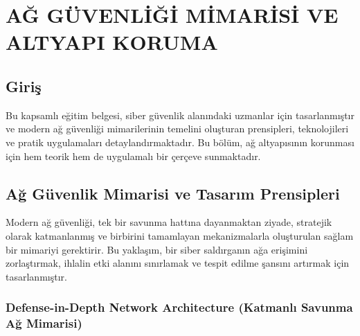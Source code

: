 \chapter{AĞ GÜVENLİĞİ MİMARİSİ VE ALTYAPI KORUMA}

\section*{Giriş}
Bu kapsamlı eğitim belgesi, siber güvenlik alanındaki uzmanlar için tasarlanmıştır ve modern ağ güvenliği mimarilerinin temelini oluşturan prensipleri, teknolojileri ve pratik uygulamaları detaylandırmaktadır. Bu bölüm, ağ altyapısının korunması için hem teorik hem de uygulamalı bir çerçeve sunmaktadır.

\section{Ağ Güvenlik Mimarisi ve Tasarım Prensipleri}

Modern ağ güvenliği, tek bir savunma hattına dayanmaktan ziyade, stratejik olarak katmanlanmış ve birbirini tamamlayan mekanizmalarla oluşturulan sağlam bir mimariyi gerektirir. Bu yaklaşım, bir siber saldırganın ağa erişimini zorlaştırmak, ihlalin etki alanını sınırlamak ve tespit edilme şansını artırmak için tasarlanmıştır.

\subsection{Defense-in-Depth Network Architecture (Katmanlı Savunma Ağ Mimarisi)}

